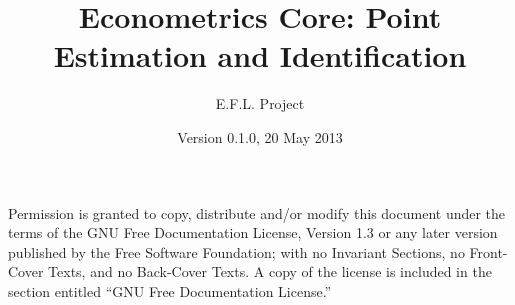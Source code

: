 \documentclass[nofonts]{tufte-latex/tufte-handout}
\title{Econometrics Core: Point Estimation and Identification}
\author{E.F.L. Project}
\date{Version 0.1.0, 20 May 2013}
\begin{document}
\maketitle
\tableofcontents

  Permission is granted to
copy, distribute and/or modify this document under the terms of the
GNU Free Documentation License, Version 1.3 or any later version
published by the Free Software Foundation; with no Invariant Sections,
no Front-Cover Texts, and no Back-Cover Texts.  A copy of the license
is included in the section entitled ``GNU Free Documentation
License.''











\appendix

\end{document}
